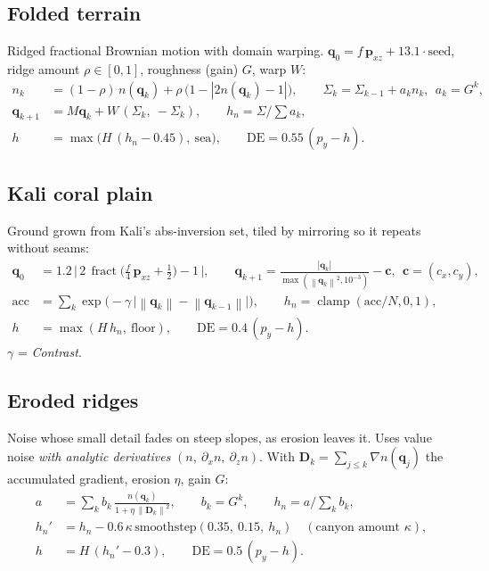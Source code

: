 \documentclass[10pt,a4paper]{article}
\newcommand{\vv}[1]{\mathbf{#1}}
\newcommand{\abs}[1]{\left|#1\right|}
\newcommand{\norm}[1]{\left\lVert#1\right\rVert}
\newcommand{\clamp}{\operatorname{clamp}}
\newcommand{\fract}{\operatorname{fract}}
\newcommand{\DE}{\mathrm{DE}}
\begin{document}
\subsection{Folded terrain}
Ridged fractional Brownian motion with domain warping. $\vv q_0=f\,\vv p_{xz}+13.1\cdot\text{seed}$, ridge amount $\rho\in[0,1]$, roughness (gain) $G$, warp $W$:
\begin{align}
n_k&=(1-\rho)\,n(\vv q_k)+\rho\,\big(1-\abs{2n(\vv q_k)-1}\big),\qquad\Sigma_k=\Sigma_{k-1}+a_k n_k,\ \ a_k=G^k,\\
\vv q_{k+1}&=M\vv q_k+W\,(\Sigma_k,\ -\Sigma_k),\qquad h_n=\Sigma\Big/\sum a_k,\\
h&=\max\!\big(H\,(h_n-0.45),\ \text{sea}\big),\qquad\DE=0.55\,(p_y-h).
\end{align}


\subsection{Kali coral plain}
Ground grown from Kali's abs-inversion set, tiled by mirroring so it repeats without seams:
\begin{align}
\vv q_0&=1.2\,\Big|\,2\,\fract\!\big(\tfrac f4\,\vv p_{xz}+\tfrac12\big)-1\,\Big|,\qquad\vv q_{k+1}=\frac{\abs{\vv q_k}}{\max(\norm{\vv q_k}^2,10^{-3})}-\vv c,\ \ \vv c=(c_x,c_y),\\
\mathrm{acc}&=\sum_k\exp\!\big(-\gamma\,\big|\norm{\vv q_k}-\norm{\vv q_{k-1}}\big|\big),\qquad h_n=\clamp(\mathrm{acc}/N,0,1),\\
h&=\max(H\,h_n,\ \text{floor}),\qquad\DE=0.4\,(p_y-h).
\end{align}
$\gamma$ = \emph{Contrast}.


\subsection{Eroded ridges}
Noise whose small detail fades on steep slopes, as erosion leaves it. Uses value noise \emph{with analytic derivatives} $(n,\ \partial_xn,\ \partial_zn)$. With $\vv D_k=\sum_{j\le k}\nabla n(\vv q_j)$ the accumulated gradient, erosion $\eta$, gain $G$:
\begin{align}
a&=\sum_k b_k\,\frac{n(\vv q_k)}{1+\eta\,\norm{\vv D_k}^2},\qquad b_k=G^k,\qquad h_n=a\Big/\sum_k b_k,\\
h_n'&=h_n-0.6\,\kappa\,\mathrm{smoothstep}(0.35,\ 0.15,\ h_n)\quad(\text{canyon amount }\kappa),\\
h&=H\,(h_n'-0.3),\qquad\DE=0.5\,(p_y-h).
\end{align}

\end{document}
